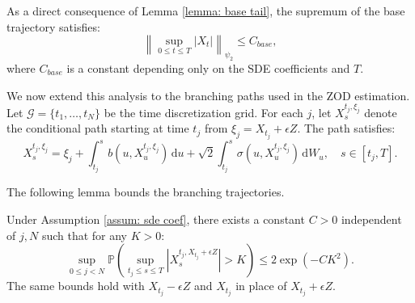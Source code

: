 \documentclass[twoside,11pt]{article}
\newcommand{\1}{\mathbf{1}}
\numberwithin{equation}{section}
\begin{document}
As a direct consequence of Lemma \ref{lemma: base tail}, the supremum of the base trajectory satisfies:
\begin{equation}\label{eq: orlicz norm upper bound}
    \left\|\sup_{0\le t\le T}|X_t|\right\|_{\psi_2} \le C_{base},
\end{equation}
where $C_{base}$ is a constant depending only on the SDE coefficients and $T$.

We now extend this analysis to the branching paths used in the ZOD estimation. Let $\mathcal{G} = \{t_1, \dots, t_N\}$ be the time discretization grid. For each $j$, let $X_s^{t_j, \xi_j}$ denote the conditional path starting at time $t_j$ from $\xi_j = X_{t_j} + \epsilon Z$. The path satisfies:
\begin{equation}
    X_s^{t_j, \xi_j} = \xi_j + \int_{t_j}^s b(u, X_u^{t_j,\xi_j}) \, \mathrm{d}u + \sqrt{2}\int_{t_j}^s \sigma(u, X_u^{t_j,\xi_j}) \, \mathrm{d}W_u, \quad s \in [t_j, T].
\end{equation}

The following lemma bounds the branching trajectories.
\begin{lemma}
\label{lemma: branching tail}
    Under Assumption \ref{assum: sde coef}, there exists a constant $C > 0$ independent of $j, N$ such that for any $K>0$:
    \begin{equation}
        \sup_{0\le j<N}
        \mathbb{P}\left(
        \sup_{t_j\le s\le T}
        \left| X^{t_j, X_{t_j}+\epsilon Z}_s\right|>K
        \right)
        \le 2\exp(-CK^2).
    \end{equation}
    The same bounds hold with $X_{t_j}-\epsilon Z$ and $ X_{t_j}$ in place of
    $X_{t_j}+\epsilon Z$.
\end{lemma}
\end{document}
